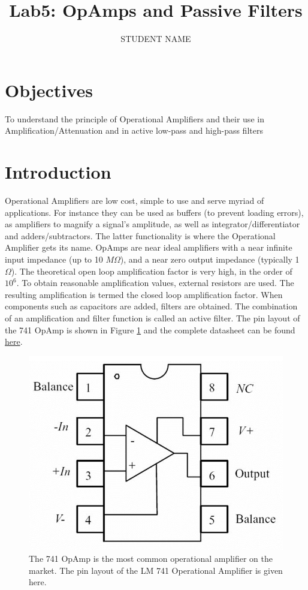 \documentclass[11pt,letterpaper]{article}
\author{STUDENT NAME}
\title{Lab5: OpAmps and Passive Filters}
\begin{document}
\maketitle

\section{Objectives}

To understand the principle of Operational Amplifiers and their use in Amplification/Attenuation and in active low-pass and high-pass filters 

\section{Introduction}

Operational Amplifiers are low cost, simple to use and serve myriad of applications. For instance they can be used as buffers (to prevent loading errors), as amplifiers to magnify a signal’s amplitude, as well as integrator/differentiator and adders/subtractors. The latter functionality is where the Operational Amplifier gets its name.
OpAmps are near ideal amplifiers with a near infinite input impedance (up to 10 $M \Omega $), and a near zero output impedance (typically 1 $ \Omega $). The theoretical open loop amplification factor is very high, in the order of $10^6$. To obtain reasonable amplification values, external resistors are used. The resulting amplification is termed the closed loop amplification factor. When components such as capacitors are added, filters are obtained. The combination of an amplification and filter function is called an active filter. The pin layout of the 741 OpAmp is shown in Figure \ref{fig:Lab5_741OpAmp} and the complete datasheet can be found \href{http://abe-research.illinois.edu/Faculty/grift/ABE425_2015/Specs/LM741.pdf}{here}.

\begin{figure}
\centering
\includegraphics[width=0.6\linewidth]{Lab5_741OpAmp}
\caption{The 741 OpAmp is the most common operational amplifier on the market. The pin layout of the LM 741 Operational Amplifier is given here.}
\label{fig:Lab5_741OpAmp}
\end{figure}
\end{document}
